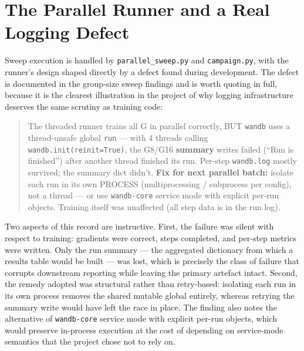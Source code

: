 \documentclass[12pt,a4paper]{report}
\begin{document}
\section{The Parallel Runner and a Real Logging
Defect}\label{the-parallel-runner-and-a-real-logging-defect}

Sweep execution is handled by \texttt{parallel\_sweep.py} and
\texttt{campaign.py}, with the runner's design shaped directly by a
defect found during development. The defect is documented in the
group-size sweep findings and is worth quoting in full, because it is
the clearest illustration in the project of why logging infrastructure
deserves the same scrutiny as training code:

\begin{quote}
The threaded runner trains all G in parallel correctly, BUT
\texttt{wandb} uses a thread-unsafe global \texttt{run} --- with 4
threads calling \texttt{wandb.init(reinit=True)}, the G8/G16
\textbf{summary} writes failed (``Run is finished'') after another
thread finished its run. Per-step \texttt{wandb.log} mostly survived;
the summary dict didn't. \textbf{Fix for next parallel batch:} isolate
each run in its own PROCESS (multiprocessing / subprocess per config),
not a thread --- or use \texttt{wandb-core} service mode with explicit
per-run objects. Training itself was unaffected (all step data is in the
run log).
\end{quote}

Two aspects of this record are instructive. First, the failure was
silent with respect to training: gradients were correct, steps
completed, and per-step metrics were written. Only the run summary ---
the aggregated dictionary from which a results table would be built ---
was lost, which is precisely the class of failure that corrupts
downstream reporting while leaving the primary artefact intact. Second,
the remedy adopted was structural rather than retry-based: isolating
each run in its own process removes the shared mutable global entirely,
whereas retrying the summary write would have left the race in place.
The finding also notes the alternative of \texttt{wandb-core} service
mode with explicit per-run objects, which would preserve in-process
execution at the cost of depending on service-mode semantics that the
project chose not to rely on.
\end{document}
